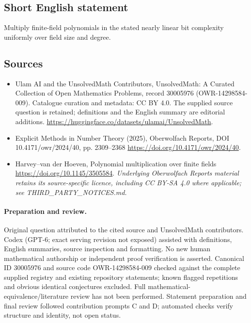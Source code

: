 \documentclass[11pt]{article}
\begin{document}
\subsection{Short English statement}
Multiply finite-field polynomials in the stated nearly linear bit complexity uniformly over field size and degree.
\subsection{Sources}
\begin{itemize}
\item[\hypertarget{source:30005976:1}{S1}] Ulam AI and the UnsolvedMath Contributors, UnsolvedMath: A Curated Collection of Open Mathematics Problems, record 30005976 (OWR-14298584-009). Catalogue curation and metadata: CC BY 4.0. The supplied source question is retained; definitions and the English summary are editorial additions.
\url{https://huggingface.co/datasets/ulamai/UnsolvedMath}.
\item[\hypertarget{source:30005976:2}{S2}] Explicit Methods in Number Theory (2025), Oberwolfach Reports, DOI 10.4171/owr/2024/40, pp. 2309--2368
\url{https://doi.org/10.4171/owr/2024/40}.
\item[\hypertarget{source:30005976:3}{S3}] Harvey--van der Hoeven, Polynomial multiplication over finite fields
\url{https://doi.org/10.1145/3505584}.
\textit{Underlying Oberwolfach Reports material retains its source-specific licence, including CC BY-SA 4.0 where applicable; see THIRD\_PARTY\_NOTICES.md.}
\end{itemize}
\paragraph{Preparation and review.}
Original question attributed to the cited source and UnsolvedMath contributors. Codex (GPT-6; exact serving revision not exposed) assisted with definitions, English summaries, source inspection and formatting. No new human mathematical authorship or independent proof verification is asserted. Canonical ID 30005976 and source code OWR-14298584-009 checked against the complete supplied registry and existing repository statements; known flagged repetitions and obvious identical conjectures excluded. Full mathematical-equivalence/literature review has not been performed. Statement preparation and final review followed contribution prompts C and D; automated checks verify structure and identity, not open status.
\label{end:30005976}
\end{document}
